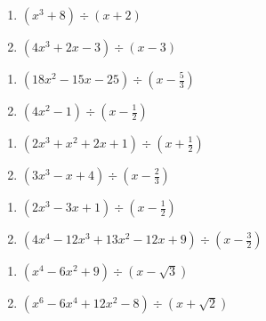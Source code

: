 \begin{multicols}{2}
\begin{enumerate}
\setcounter{enumi}{\value{HW}}

\item $\left(x^3 + 8 \right) \div \left(x+2\right)$
\item $\left(4x^3 +2x-3 \right) \div \left(x -3\right)$

\setcounter{HW}{\value{enumi}}
\end{enumerate}
\end{multicols}

\begin{multicols}{2}
\begin{enumerate}
\setcounter{enumi}{\value{HW}}

\item $\left(18x^2-15x-25\right) \div \left(x - \frac{5}{3} \right)$
\item $\left(4x^2-1 \right) \div \left(x - \frac{1}{2} \right)$

\setcounter{HW}{\value{enumi}}
\end{enumerate}
\end{multicols}

\begin{multicols}{2}
\begin{enumerate}
\setcounter{enumi}{\value{HW}}

\item $\left(2x^3+x^2+2x+1 \right) \div \left(x + \frac{1}{2} \right)$
\item $\left(3x^3 - x + 4 \right) \div \left(x - \frac{2}{3} \right)$

\setcounter{HW}{\value{enumi}}
\end{enumerate}
\end{multicols}

\begin{multicols}{2}
\begin{enumerate}
\setcounter{enumi}{\value{HW}}

\item $\left(2x^3 - 3x +1 \right) \div \left(x - \frac{1}{2} \right)$
\item $\left(4x^4-12x^3+13x^2 -12x+9\right) \div \left(x - \frac{3}{2} \right)$

\setcounter{HW}{\value{enumi}}
\end{enumerate}
\end{multicols}

\begin{multicols}{2}
\begin{enumerate}
\setcounter{enumi}{\value{HW}}

\item $\left(x^4-6x^2+9 \right) \div \left(x -\sqrt{3} \right)$
\item $\left(x^6-6x^4+12x^2-8\right) \div \left(x +\sqrt{2} \right)$ \label{synthdivreviewlast}

\setcounter{HW}{\value{enumi}}
\end{enumerate}
\end{multicols}

